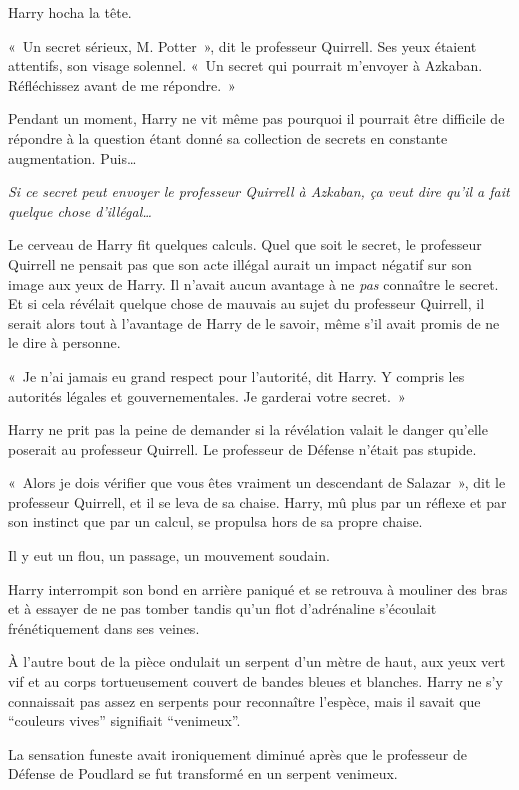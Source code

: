 Harry hocha la tête.

«~Un secret sérieux, M. Potter~», dit le professeur Quirrell.
Ses yeux étaient attentifs, son visage solennel.
«~Un secret qui pourrait m'envoyer à Azkaban.
Réfléchissez avant de me répondre.~»

Pendant un moment, Harry ne vit même pas pourquoi il pourrait être difficile de répondre à la question étant donné sa collection de secrets en constante augmentation.
Puis…

\emph{Si ce secret peut envoyer le professeur Quirrell à Azkaban, ça veut dire qu'il a fait quelque chose d'illégal…}

Le cerveau de Harry fit quelques calculs.
Quel que soit le secret, le professeur Quirrell ne pensait pas que son acte illégal aurait un impact négatif sur son image aux yeux de Harry.
Il n'avait aucun avantage à ne \emph{pas} connaître le secret.
Et si cela révélait quelque chose de mauvais au sujet du professeur Quirrell, il serait alors tout à l'avantage de Harry de le savoir, même s'il avait promis de ne le dire à personne.

«~Je n'ai jamais eu grand respect pour l'autorité, dit Harry.
Y compris les autorités légales et gouvernementales.
Je garderai votre secret.~»

Harry ne prit pas la peine de demander si la révélation valait le danger qu'elle poserait au professeur Quirrell.
Le professeur de Défense n'était pas stupide.

«~Alors je dois vérifier que vous êtes vraiment un descendant de Salazar~», dit le professeur Quirrell, et il se leva de sa chaise.
Harry, mû plus par un réflexe et par son instinct que par un calcul, se propulsa hors de sa propre chaise.

Il y eut un flou, un passage, un mouvement soudain.

Harry interrompit son bond en arrière paniqué et se retrouva à mouliner des bras et à essayer de ne pas tomber tandis qu'un flot d'adrénaline s'écoulait frénétiquement dans ses veines.

À l'autre bout de la pièce ondulait un serpent d'un mètre de haut, aux yeux vert vif et au corps tortueusement couvert de bandes bleues et blanches.
Harry ne s'y connaissait pas assez en serpents pour reconnaître l'espèce, mais il savait que “couleurs vives” signifiait “venimeux”.

La sensation funeste avait ironiquement diminué après que le professeur de Défense de Poudlard se fut transformé en un serpent venimeux.

